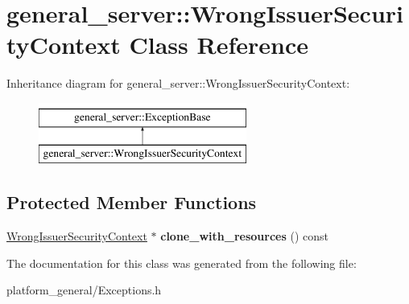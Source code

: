 \hypertarget{classgeneral__server_1_1WrongIssuerSecurityContext}{\section{general\-\_\-server\-:\-:\-Wrong\-Issuer\-Security\-Context \-Class \-Reference}
\label{classgeneral__server_1_1WrongIssuerSecurityContext}
}
\-Inheritance diagram for general\-\_\-server\-:\-:\-Wrong\-Issuer\-Security\-Context\-:\begin{figure}[H]
\begin{center}
\leavevmode
\includegraphics[height=2.000000cm]{classgeneral__server_1_1WrongIssuerSecurityContext}
\end{center}
\end{figure}
\subsection*{\-Protected \-Member \-Functions}
\begin{DoxyCompactItemize}
\item 
\hypertarget{classgeneral__server_1_1WrongIssuerSecurityContext_ace7983f8377ab337130cbb5948ee1d7c}{\hyperlink{classgeneral__server_1_1WrongIssuerSecurityContext}{\-Wrong\-Issuer\-Security\-Context} $\ast$ {\bfseries clone\-\_\-with\-\_\-resources} () const }\label{classgeneral__server_1_1WrongIssuerSecurityContext_ace7983f8377ab337130cbb5948ee1d7c}

\end{DoxyCompactItemize}


\-The documentation for this class was generated from the following file\-:\begin{DoxyCompactItemize}
\item 
platform\-\_\-general/\-Exceptions.\-h\end{DoxyCompactItemize}
